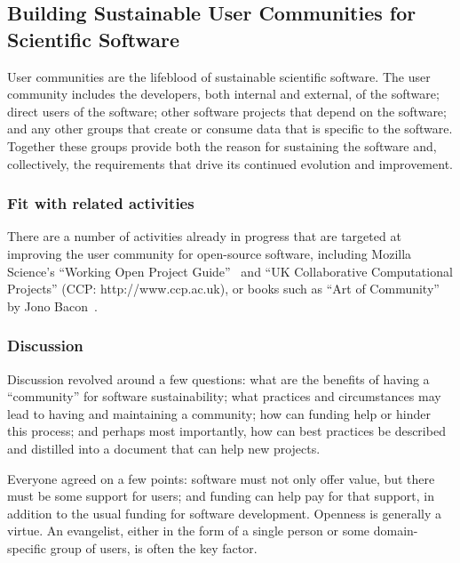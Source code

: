\subsection{Building Sustainable User Communities for Scientific Software}


User communities are the lifeblood of sustainable scientific software. The user
community includes the developers, both internal and external, of the software;
direct users of the software; other software projects that depend on the
software; and any other groups that create or consume data that is specific to
the software. Together these groups provide both the reason for sustaining the
software and, collectively, the requirements that drive its continued evolution
and improvement.

\subsubsection{Fit with related activities}

There are a number of activities already in progress that are targeted at improving
the user community for open-source software, including Mozilla Science's ``Working Open Project
Guide''~\cite{working-open-wssspe3} and
``UK Collaborative Computational Projects'' (CCP: http://www.ccp.ac.uk), or 
 books such as ``Art of Community'' by Jono Bacon~\cite{art-of-community}. 

\subsubsection{Discussion}

Discussion revolved around a few questions: what are the benefits of having a
``community'' for software sustainability; what practices and circumstances may lead
to having and maintaining a community; how can funding help or hinder this
process; and perhaps most importantly, how can best practices be described and
distilled into a document that can help new projects.

Everyone agreed on a few points: software must not only offer value, but there
must be some support for users; and funding can help pay for that support, in
addition to the usual funding for software development. Openness is generally 
a virtue. An evangelist, either in the form of a single person or some
domain-specific group of users, is often the key factor.

